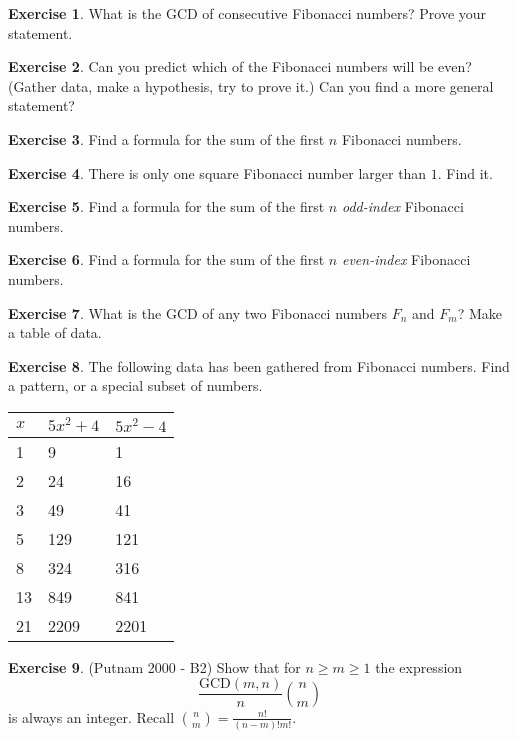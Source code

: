 \documentclass[11pt]{article}
\theoremstyle{definition}
\newtheorem{exercise}{Exercise}
\numberwithin{thm}{section}
\begin{document}
\begin{exercise} What is the GCD of consecutive Fibonacci numbers? Prove your statement.
\end{exercise}

\begin{exercise} Can you predict which of the Fibonacci numbers will be even? (Gather data, make a hypothesis, try to prove it.) Can you find a more general statement?
\end{exercise}

\begin{exercise} Find a formula for the sum of the first $n$ Fibonacci numbers. 
\end{exercise}

\begin{exercise} There is only one square Fibonacci number larger than $1$. Find it.
\end{exercise}

\begin{exercise} Find a formula for the sum of the first $n$ \textit{odd-index} Fibonacci numbers.
\end{exercise}

\begin{exercise} Find a formula for the sum of the first $n$ \textit{even-index} Fibonacci numbers.
\end{exercise}

\begin{exercise} What is the GCD of any two Fibonacci numbers $F_n$ and $F_m$? Make a table of data.
\end{exercise}

\begin{exercise} The following data has been gathered from Fibonacci numbers. Find a pattern, or a special subset of numbers.

\begin{table}[ht!]
\begin{tabular}{l|l|l}
$x$ & $5x^2+4$ & $5x^2 - 4$ \\ \hline
1 & 9 & 1 \\
2 & 24 & 16 \\
3 & 49 & 41 \\
5 & 129 & 121 \\
8 & 324 & 316 \\
13 & 849 & 841 \\
21 & 2209 & 2201
\end{tabular}
\end{table}
\end{exercise}

\begin{exercise} (Putnam 2000 - B2) Show that for $n \geq m \geq 1$ the expression
\[
	\frac{\text{GCD}(m,n)}{n}\binom{n}{m}
\]
is always an integer. Recall $\binom{n}{m} = \frac{n!}{(n-m)!m!}$.
\end{exercise}
\end{document}
